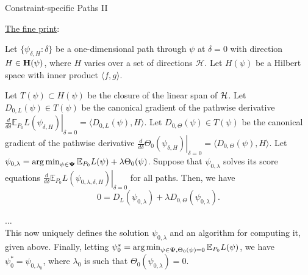 \documentclass[12pt,t,handout]{beamer}
\newcommand{\E}{\mathbb{E}}
\DeclareMathOperator*{\argmin}{arg\,min}
\begin{document}
\begin{frame}[c]{Constraint-specific Paths II}

\begin{center}
\underline{The fine print}:

\scriptsize{
\begin{theorem}
Let $\{\psi_{\delta, H}: \delta \}$ be a one-dimensional path through $\psi$ at
$\delta = 0$ with direction $H \in {\bf H}(\psi)$, where $H$ varies over a set
of directions $\mathcal{H}$. Let $H(\psi)$ be a Hilbert space with inner product
$\langle f, g \rangle$.

\vspace{1em}

Let $T(\psi) \subset H(\psi)$ be the closure of the linear span of ${\cal H}$.
Let $D_{0, L}(\psi) \in T(\psi)$ be the canonical gradient of the pathwise
derivative $\left . \frac{d}{d \delta} \E_{P_0}L(\psi_{\delta, H}) \right
|_{\delta = 0} = \langle D_{0, L}(\psi), H \rangle$. Let $D_{0, \Theta}(\psi)
\in T(\psi)$ be the canonical gradient of the pathwise derivative $\left .
 \frac{d}{d \delta}\Theta_0(\psi_{\delta, H}) \right |_{\delta = 0} =
 \langle D_{0, \Theta}(\psi), H \rangle$. Let
$\psi_{0, \lambda} = \argmin_{\psi \in {\bf \Psi}} \E_{P_0}L(\psi) + \lambda
\Theta_0(\psi)$. Suppose that $\psi_{0, \lambda}$ solves its score equations
$\left . \frac{d}{d \delta} \E_{P_0}L(\psi_{0, \lambda, \delta, H}) \right
|_{\delta = 0}$ for all paths. Then, we have
\begin{equation}\label{lfmpathconditiona}
0 = D_L(\psi_{0, \lambda}) + \lambda D_{0, \Theta}(\psi_{0, \lambda}).
\end{equation}

$\dots$\\

This now uniquely defines the solution $\psi_{0, \lambda}$ and an algorithm for
computing it, given above. Finally, letting $\psi_0^* = \argmin_{\psi \in {\bf
\Psi}, \Theta_0(\psi) = 0} \E_{P_0}L(\psi)$, we have $\psi_0^* = \psi_{0,
 \lambda_0}$, where $\lambda_0$ is such that $\Theta_0(\psi_{0, \lambda}) = 0$.
\end{theorem}
}

\end{center}

\note{
}

\end{frame}

\end{document}
